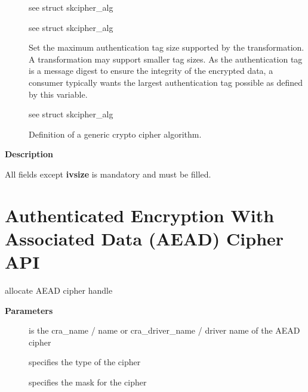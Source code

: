 \documentclass[a4paper,8pt,english]{sphinxmanual}
\begin{document}
\begin{description}
\item[{}] \leavevmode
see struct skcipher\_alg

\item[{}] \leavevmode
see struct skcipher\_alg

\item[{}] \leavevmode
Set the maximum authentication tag size supported by the
transformation. A transformation may support smaller tag sizes.
As the authentication tag is a message digest to ensure the
integrity of the encrypted data, a consumer typically wants the
largest authentication tag possible as defined by this
variable.

\item[{}] \leavevmode
see struct skcipher\_alg

\item[{}] \leavevmode
Definition of a generic crypto cipher algorithm.

\end{description}

\textbf{Description}

All fields except \textbf{ivsize} is mandatory and must be filled.


\section{Authenticated Encryption With Associated Data (AEAD) Cipher API}
\label{crypto/api-aead:authenticated-encryption-with-associated-data-aead-cipher-api}

\begin{fulllineitems}
\label{crypto/api-aead:c.crypto_alloc_aead}
allocate AEAD cipher handle

\end{fulllineitems}


\textbf{Parameters}
\begin{description}
\item[{}] \leavevmode
is the cra\_name / name or cra\_driver\_name / driver name of the
AEAD cipher

\item[{}] \leavevmode
specifies the type of the cipher

\item[{}] \leavevmode
specifies the mask for the cipher

\end{description}
\end{document}
